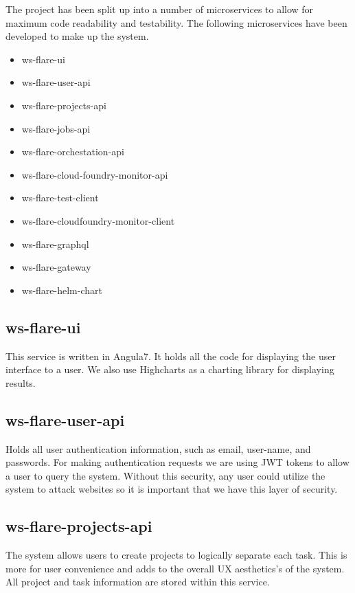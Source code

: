 The project has been split up into a number of microservices to allow for maximum code readability and testability. The following microservices have been developed to make up the system.

\begin{itemize}
  \item ws-flare-ui
  \item ws-flare-user-api
  \item ws-flare-projects-api
  \item ws-flare-jobs-api
  \item ws-flare-orchestation-api
  \item ws-flare-cloud-foundry-monitor-api
  \item ws-flare-test-client
  \item ws-flare-cloudfoundry-monitor-client
  \item ws-flare-graphql
  \item ws-flare-gateway
  \item ws-flare-helm-chart
\end{itemize}

\subsection{ws-flare-ui}

This service is written in Angula7. It holds all the code for displaying the user interface to a user. We also use Highcharts as a charting library for displaying results.

\subsection{ws-flare-user-api}

Holds all user authentication information, such as email, user-name, and passwords. For making authentication requests we are using JWT tokens to allow a user to query the system. Without this security, any user could utilize the system to attack websites so it is important that we have this layer of security.

\subsection{ws-flare-projects-api}

The system allows users to create projects to logically separate each task. This is more for user convenience and adds to the overall UX aesthetics's of the system. All project and task information are stored within this service. 

